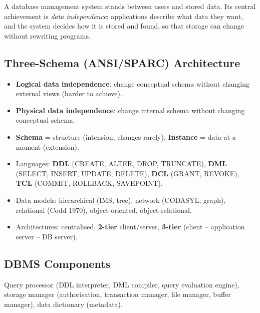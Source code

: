 A database management system stands between users and stored data. Its central achievement is \emph{data
independence}: applications describe what data they want, and the system decides how it is stored and
found, so that storage can change without rewriting programs.

\needspace{95pt}

\hypertarget{p2-04--11-three-schema-ansisparc-architecture}{%
\subsection{Three-Schema (ANSI/SPARC) Architecture}\label{p2-04--11-three-schema-ansisparc-architecture}}



\begin{itemize}
\tightlist
\item
  \textbf{Logical data independence}: change conceptual schema without changing external views (harder to achieve).
\item
  \textbf{Physical data independence}: change internal schema without changing conceptual schema.
\item
  \textbf{Schema} = structure (intension, changes rarely); \textbf{Instance} = data at a moment (extension).
\item
  Languages: \textbf{DDL} (CREATE, ALTER, DROP, TRUNCATE), \textbf{DML} (SELECT, INSERT, UPDATE, DELETE), \textbf{DCL} (GRANT, REVOKE), \textbf{TCL} (COMMIT, ROLLBACK, SAVEPOINT).
\item
  Data models: hierarchical (IMS, tree), network (CODASYL, graph), relational (Codd 1970), object-oriented, object-relational.
\item
  Architectures: centralised, \textbf{2-tier} client/server, \textbf{3-tier} (client -- application server -- DB server).
\end{itemize}

\needspace{191pt}

\hypertarget{p2-04--12-dbms-components}{%
\subsection{DBMS Components}\label{p2-04--12-dbms-components}}

Query processor (DDL interpreter, DML compiler, query evaluation engine), storage manager (authorisation, transaction manager, file manager, buffer manager), data dictionary (metadata).

\needspace{125pt}

